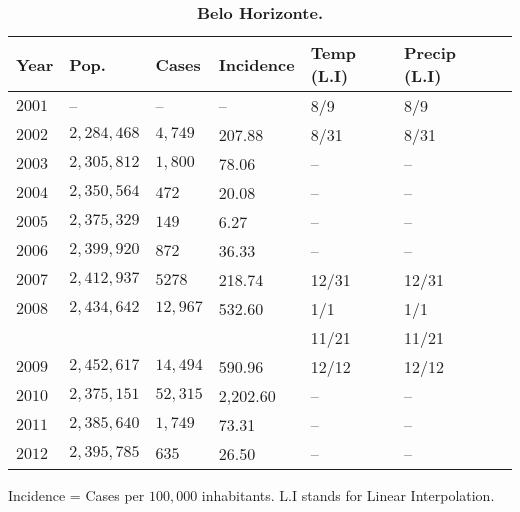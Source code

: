 \documentclass[final,leqno]{siamltexmm2}
\begin{document}
\begin{table}[!ht]
\centering
\caption{
{\bf Belo Horizonte.}}
\begin{tabular}{|l|l|l|l|l|l|l|}
\hline
\multicolumn{1}{|l|}{\bf Year} & \multicolumn{1}{|l|}{\bf Pop.} & \multicolumn{1}{|l|}{\bf Cases}&\multicolumn{1}{|l|}{\bf Incidence}&\multicolumn{1}{|l|}{\bf Temp (L.I)}&\multicolumn{1}{|l|}{\bf Precip (L.I)} \\ \hline %
$2001$ &    --         &     --         &     --                & 8/9   & 8/9  \\ \hline
$2002$ & $2,284,468$ & $4,749$  &   \cellcolor{red!25}207.88 & 8/31   & 8/31  \\ \hline
$2003$ & $2,305,812$ & $ 1,800$  &  \cellcolor{blue!25}78.06 &  --        & -- \\ \hline
$2004$ & $2,350,564$ & $472 $   &  \cellcolor{blue!25} 20.08 &  --      & -- \\ \hline
$2005$ & $2,375,329$ & $149 $   &  \cellcolor{blue!25} 6.27  &   --       & --\\ \hline
$2006$ & $  2,399,920$ & $872 $   & \cellcolor{blue!25} 36.33&   --       & --\\ \hline
$2007$ & $  2,412,937$ & $ 5278$    &  \cellcolor{red!25} 218.74 & 12/31   & 12/31 \\ \hline
$2008$ & $ 2,434,642$ & $12,967$ & \cellcolor{red!25}532.60  &  1/1    &  1/1  \\ 
       &              &          &    \cellcolor{red!25}     &  11/21  &  11/21  \\ \hline
$2009$ & $   2,452,617$ & $14,494$  & \cellcolor{red!25}590.96 &  12/12    & 12/12\\ \hline
$2010$ & $ 2,375,151$ & $52,315$    &  \cellcolor{red!25} 2,202.60 &  --    & --\\ \hline
$2011$ & $2,385,640$ & $1,749$  &  \cellcolor{blue!25} 73.31 &  --        & --\\ \hline
$2012$ & $2,395,785$ & $635$  & \cellcolor{blue!25}26.50 & --       & -- \\ \hline
\end{tabular}
\begin{flushleft}
\vspace{.5cm}
Incidence = Cases per $100,000$ inhabitants.  L.I stands for Linear Interpolation.
\end{flushleft}
\label{table4}
\end{table}
\end{document}
